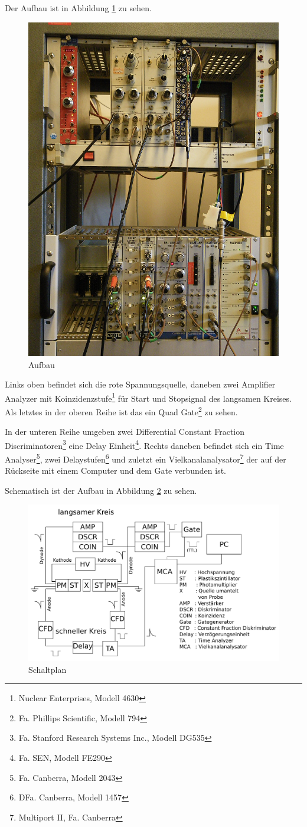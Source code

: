 \documentclass[a4paper,12pt]{article}
\begin{document}
Der Aufbau ist in Abbildung \ref{fig:aufbau} zu sehen.
\begin{figure}[htb]
		\centering
		\includegraphics[width=.5\textwidth]{aufbau.jpg}
		\caption{Aufbau}
		\label{fig:aufbau}
\end{figure}

Links oben befindet sich die rote Spannungsquelle, daneben zwei Amplifier Analyzer mit Koinzidenzstufe\footnote{Nuclear Enterprises, Modell 4630} für Start und Stopsignal des langsamen Kreises.
Als letztes in der oberen Reihe ist das ein Quad Gate\footnote{Fa. Phillips Scientific, Modell 794} zu sehen.

In der unteren Reihe umgeben zwei Differential Constant Fraction Discriminatoren\footnote{Fa. Stanford Research Systems Inc., Modell DG535} eine Delay Einheit\footnote{Fa. SEN, Modell FE290}.
Rechts daneben befindet sich ein Time Analyser\footnote{Fa. Canberra, Modell 2043}, zwei Delaystufen\footnote{DFa. Canberra, Modell 1457} und zuletzt ein Vielkanalanalysator\footnote{Multiport II, Fa. Canberra} der auf der Rückseite mit einem Computer und dem Gate verbunden ist.

Schematisch ist der Aufbau in Abbildung \ref{fig:schaltplan} zu sehen.

\begin{figure}[htb]
		\centering
		\includegraphics[width=1.0\textwidth]{Schaltplan_custom.pdf}
		\caption{Schaltplan}
		\label{fig:schaltplan}
\end{figure}
\end{document}
